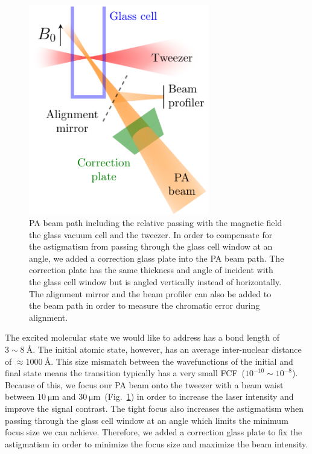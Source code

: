 \begin{figure}
  \centering
  \includegraphics[width=0.7\textwidth]{figures/pa_beampath.pdf}
  \caption[PA beam path]{
    PA beam path including the relative passing with the magnetic field
    the glass vacuum cell and the tweezer.
    In order to compensate for the astigmatism from passing through the glass cell window
    at an angle, we added a correction glass plate into the PA beam path.
    The correction plate has the same thickness and angle of incident with the glass cell window
    but is angled vertically instead of horizontally.
    The alignment mirror and the beam profiler can also be added to the beam path
    in order to measure the chromatic error during alignment.
    \label{fig:pa:beampath}}
\end{figure}

The excited molecular state we would like to address has a bond length of $3\sim8~\text{\AA}$.
The initial atomic state, however, has an average inter-nuclear distance of
$\approx\!1000~\text{\AA}$.
This size mismatch between the wavefunctions of the initial and final state
means the transition typically has a very small FCF~($10^{-10}\sim10^{-8}$).
Because of this, we focus our PA beam onto the tweezer with a beam waist between
$10~\mathrm{\mu m}$ and $30~\mathrm{\mu m}$~(Fig.~\ref{fig:pa:beampath}) in order to
increase the laser intensity and improve the signal contrast.
The tight focus also increases the astigmatism when passing through
the glass cell window at an angle which limits the minimum focus size we can achieve.
Therefore, we added a correction glass plate to fix the astigmatism
in order to minimize the focus size and maximize the beam intensity.

